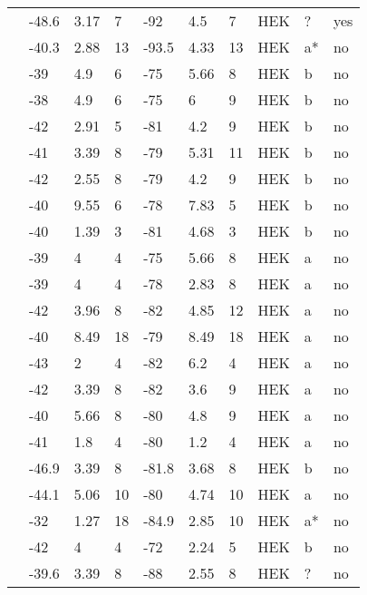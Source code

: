 \begin{longtable}{p{5cm}|lll|lll|lll}
\citet{Tan2001MutationDB} & -48.6 & 3.17 & 7 & -92 & 4.5 & 7 & HEK & ? & yes \\
\citet{Tan2002MutationDB} & -40.3 & 2.88 & 13 & -93.5 & 4.33 & 13 & HEK & a* & no \\
\citet{Tan2005MutationDB} & -39 & 4.9 & 6 & -75 & 5.66 & 8 & HEK & b & no \\
\citet{Tan2005MutationDB} & -38 & 4.9 & 6 & -75 & 6 & 9 & HEK & b & no \\
\citet{Tan2005MutationDB} & -42 & 2.91 & 5 & -81 & 4.2 & 9 & HEK & b & no \\
\citet{Tan2005MutationDB} & -41 & 3.39 & 8 & -79 & 5.31 & 11 & HEK & b & no \\
\citet{Tan2005MutationDB} & -42 & 2.55 & 8 & -79 & 4.2 & 9 & HEK & b & no \\
\citet{Tan2005MutationDB} & -40 & 9.55 & 6 & -78 & 7.83 & 5 & HEK & b & no \\
\citet{Tan2005MutationDB} & -40 & 1.39 & 3 & -81 & 4.68 & 3 & HEK & b & no \\
\citet{Tan2005MutationDB} & -39 & 4 & 4 & -75 & 5.66 & 8 & HEK & a & no \\
\citet{Tan2005MutationDB} & -39 & 4 & 4 & -78 & 2.83 & 8 & HEK & a & no \\
\citet{Tan2005MutationDB} & -42 & 3.96 & 8 & -82 & 4.85 & 12 & HEK & a & no \\
\citet{Tan2005MutationDB} & -40 & 8.49 & 18 & -79 & 8.49 & 18 & HEK & a & no \\
\citet{Tan2005MutationDB} & -43 & 2 & 4 & -82 & 6.2 & 4 & HEK & a & no \\
\citet{Tan2005MutationDB} & -42 & 3.39 & 8 & -82 & 3.6 & 9 & HEK & a & no \\
\citet{Tan2005MutationDB} & -40 & 5.66 & 8 & -80 & 4.8 & 9 & HEK & a & no \\
\citet{Tan2005MutationDB} & -41 & 1.8 & 4 & -80 & 1.2 & 4 & HEK & a & no \\
\citet{Tan2006MutationDB} & -46.9 & 3.39 & 8 & -81.8 & 3.68 & 8 & HEK & b & no \\
\citet{Tan2006MutationDB} & -44.1 & 5.06 & 10 & -80 & 4.74 & 10 & HEK & a & no \\
\citet{Tarradas2013MutationDB} & -32 & 1.27 & 18 & -84.9 & 2.85 & 10 & HEK & a* & no \\
\citet{Tester2010MutationDB} & -42 & 4 & 4 & -72 & 2.24 & 5 & HEK & b & no \\
\citet{Tsurugi2009MutationDB} & -39.6 & 3.39 & 8 & -88 & 2.55 & 8 & HEK & ? & no \\

\end{longtable}
